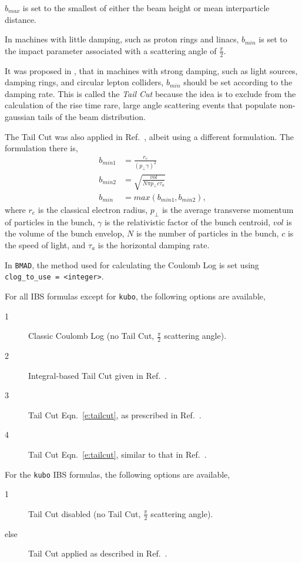 \documentclass[11pt]{article}
\begin{document}
$b_{max}$ is set to the smallest of either the beam height or mean interparticle distance. 

In machines with little damping, such as proton rings and linacs, $b_{min}$ is set to the
impact parameter associated with a scattering angle of $\frac{\pi}{2}$.

It was proposed in \cite{b:raubenheimer}, that
in machines with strong damping, such as light sources, damping rings, and circular
lepton colliders, $b_{min}$ should be set according to the damping rate.  This 
is called the {\it Tail Cut} because the idea is to exclude from the calculation of the
rise time rare, large angle scattering events that populate non-gaussian tails
of the beam distribution.

The Tail Cut was also applied in Ref.~\cite{b:kubo}, albeit using a different formulation.
The formulation there is,
\begin{align}
b_{min1}&=\frac{r_e}{\left(p_\perp \gamma\right)^2}\\
b_{min2}&=\sqrt{\frac{vol}{N\pi p_\perp c \tau_a}}\\
b_{min}&=max\left(b_{min1},b_{min2}\right),
\label{e:tailcut}
\end{align}
where $r_e$ is the classical electron radius, $p_\perp$ is the average 
transverse momentum of particles in the bunch, $\gamma$ is the relativistic factor
of the bunch centroid, $vol$ is the volume of the bunch envelop, $N$ is the number
of particles in the bunch, $c$ is the speed of light, and $\tau_a$ is the 
horizontal damping rate.

In {\tt BMAD}, the method used for calculating the Coulomb Log is set 
using {\tt clog_to_use = <integer>}.  

For all IBS formulas except for {\tt kubo}, the following options are available,
\begin{description}
\item[1] Classic Coulomb Log (no Tail Cut, $\frac{\pi}{2}$ scattering angle).
\item[2] Integral-based Tail Cut given in Ref.~\cite{b:raubenheimer}.
\item[3] Tail Cut Eqn.~\ref{e:tailcut}, as prescribed in Ref.~\cite{b:bane-tc}.
\item[4] Tail Cut Eqn.~\ref{e:tailcut}, similar to that in Ref.~\cite{b:kubo}.
\end{description}

For the {\tt kubo} IBS formulas, the following options are available,
\begin{description}
\item[1]    Tail Cut disabled (no Tail Cut, $\frac{\pi}{2}$ scattering angle).
\item[else] Tail Cut applied as described in Ref.~\cite{b:kubo}.
\end{description}
\end{document}
